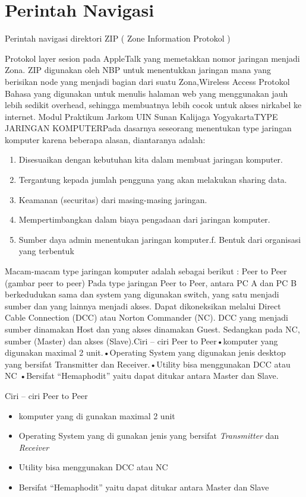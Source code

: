 \section{Perintah Navigasi}
Perintah navigasi direktori
ZIP ( Zone Information Protokol )

Protokol layer sesion pada AppleTalk yang memetakkan nomor jaringan menjadi Zona. ZIP digunakan oleh NBP untuk menentukkan jaringan mana yang berisikan node yang menjadi bagian dari suatu Zona,Wireless Access Protokol Bahasa yang digunakan untuk menulis halaman web yang menggunakan jauh lebih sedikit overhead, sehingga membuatnya lebih cocok untuk akses nirkabel ke internet.
Modul Praktikum Jarkom UIN Sunan Kalijaga YogyakartaTYPE JARINGAN KOMPUTERPada   dasarnya   seseorang   menentukan   type   jaringan   komputer   karena beberapa alasan, diantaranya adalah:
\begin{enumerate}
\item Disesuaikan dengan kebutuhan kita dalam membuat jaringan komputer.

\item Tergantung kepada jumlah pengguna yang akan melakukan sharing data.

\item Keamanan (securitas) dari masing-masing jaringan.

\item Mempertimbangkan dalam biaya pengadaan dari jaringan komputer.

\item Sumber daya admin menentukan jaringan komputer.f. Bentuk dari organisasi yang terbentuk

\end{enumerate}
Macam-macam type jaringan komputer adalah sebagai berikut :
Peer to Peer
(gambar peer to peer)
Pada type jaringan Peer to Peer, antara PC A dan PC B berkedudukan sama dan system yang digunakan switch, yang satu menjadi sumber dan yang lainnya menjadi akses. Dapat dikoneksikan melalui Direct Cable Connection (DCC) atau Norton Commander (NC).
DCC   yang  menjadi  sumber   dinamakan  Host  dan   yang   akses  dinamakan Guest. Sedangkan pada NC, sumber (Master) dan akses (Slave).Ciri – ciri Peer to Peer•komputer yang digunakan maximal 2 unit.•Operating System yang digunakan jenis desktop yang bersifat Transmitter dan Receiver.•Utility bisa menggunakan DCC atau NC •Bersifat “Hemaphodit” yaitu dapat ditukar antara Master dan Slave.

Ciri – ciri Peer to Peer
\begin{itemize}
\item komputer yang di gunakan maximal 2 unit

\item Operating System yang di gunakan jenis yang bersifat \emph{Transmitter} dan \emph{Receiver}

\item Utility bisa menggunakan DCC atau NC

\item Bersifat “Hemaphodit” yaitu dapat ditukar antara Master dan Slave

\end{itemize}

